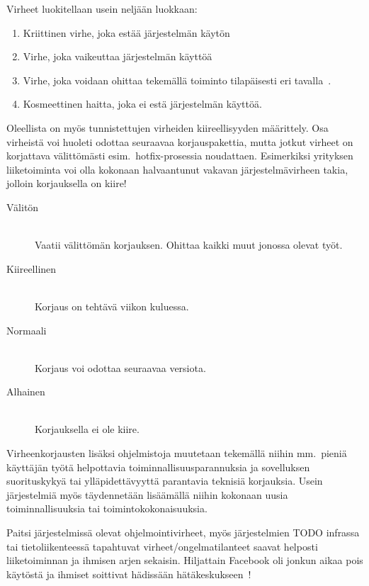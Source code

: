 \documentclass[finnish]{tktltiki2}
\theoremstyle{definition}
\theoremstyle{remark}
\begin{document}
Virheet luokitellaan usein neljään luokkaan:
\begin{enumerate}
  \item Kriittinen virhe, joka estää järjestelmän käytön~\cite{testaus-kriittisyys}
  \item Virhe, joka vaikeuttaa järjestelmän käyttöä~\cite{testaus-kriittisyys}
  \item Virhe, joka voidaan ohittaa tekemällä toiminto tilapäisesti eri tavalla~\cite{testaus-kriittisyys}.
\item Kosmeettinen haitta, joka ei estä järjestelmän käyttöä\cite{testaus-kriittisyys}.
\end{enumerate}

Oleellista on myös tunnistettujen virheiden kiireellisyyden määrittely. Osa virheistä voi huoleti odottaa seuraavaa korjauspakettia, mutta jotkut virheet on korjattava välittömästi esim.\ hotfix-prosessia noudattaen. Esimerkiksi yrityksen liiketoiminta voi olla kokonaan halvaantunut vakavan järjestelmävirheen takia, jolloin korjauksella on kiire!

\begin{description}
  \item[Välitön] \hfill \\
  Vaatii välittömän korjauksen. Ohittaa kaikki muut jonossa olevat työt.
  \item[Kiireellinen] \hfill \\
  Korjaus on tehtävä viikon kuluessa.
  \item[Normaali] \hfill \\
  Korjaus voi odottaa seuraavaa versiota.
  \item[Alhainen] \hfill \\
  Korjauksella ei ole kiire.
\end{description}


Virheenkorjausten lisäksi ohjelmistoja muutetaan tekemällä niihin mm.\ pieniä käyttäjän työtä helpottavia toiminnallisuusparannuksia ja sovelluksen suorituskykyä tai ylläpidettävyyttä parantavia teknisiä korjauksia. Usein järjestelmiä myös täydennetään lisäämällä niihin kokonaan uusia toiminnallisuuksia tai toimintokokonaisuuksia.

Paitsi järjestelmissä olevat ohjelmointivirheet, myös järjestelmien TODO infrassa tai tietoliikenteessä tapahtuvat virheet/ongelmatilanteet saavat helposti liiketoiminnan ja ihmisen arjen sekaisin. Hiljattain Facebook oli jonkun aikaa pois käytöstä ja ihmiset soittivat hädissään hätäkeskukseen~\cite{facebook-down}!
\end{document}
